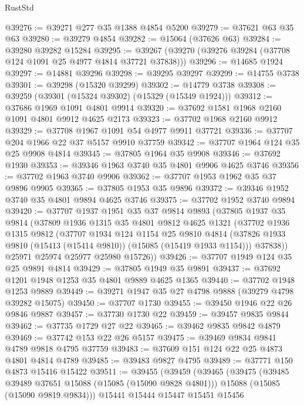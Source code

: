 \begin{lexlean}{RustStd}
\begin{coremodule}
@39276 := @39271 @277 @35 @1388 @4854 @5200
@39279 := @37621 @63 @35 @63
@39280 := @39279 @4854
@39282 := @15064 (@37626 @63)
@39284 := @39280 @39282 @15284
@39295 := @39267 (@39270 (@39276 @39284 (@37708 @124 @1091 @25 @4977 @4814 @37721 @37838)))
@39296 := @14685 @1924
@39297 := @14881 @39296
@39298 := @39295 @39297
@39299 := @14755 @3738
@39301 := @39298 (@15320 @39299)
@39302 := @14779 @3738
@39308 := @39259 (@39301 (@15324 @39302) (@15329 (@15349 @1924)))
@39312 := @37686 @1969 @1091 @4801 @9914
@39320 := @37692 @1581 @1968 @2160 @1091 @4801 @9912 @4625 @2173
@39323 := @37702 @1968 @2160 @9912
@39329 := @37708 @1967 @1091 @54 @4977 @9911 @37721
@39336 := @37707 @204 @1966 @22 @37 @5157 @9910 @37759
@39342 := @37707 @1964 @124 @35 @25 @9908 @4814
@39345 := @37805 @1964 @35 @9908
@39346 := @37692 @1930
@39353 := @39346 @1963 @3740 @35 @4801 @9906 @4625 @3746
@39356 := @37702 @1963 @3740 @9906
@39362 := @37707 @1953 @1962 @35 @37 @9896 @9905
@39365 := @37805 @1953 @35 @9896
@39372 := @39346 @1952 @3740 @35 @4801 @9894 @4625 @3746
@39375 := @37702 @1952 @3740 @9894
@39420 := @37707
    @1937
    @1951
    @35
    @37
    @9814
    @9893
    (@37805
      @1937
      @35
      @9814
      (@37809
        @1936
        @1315
        @35
        @4801
        @9812
        @4625
        @1321
        (@37702
          @1936
          @1315
          @9812
          (@37707
            @1934
            @124
            @1154
            @25
            @9810
            @4814
            (@37826 @1933 @9810 (@15413 (@15414 @9810)) (@15085 (@15419 @1933 @1154)))
            @37838))
        @25971
        @25974
        @25977
        @25980
        @15726))
@39426 := @37707 @1949 @124 @35 @25 @9891 @4814
@39429 := @37805 @1949 @35 @9891
@39437 := @37692 @1201 @1948 @1253 @35 @4801 @9889 @4625 @1365
@39440 := @37702 @1948 @1253 @9889
@39449 := @39271 @1947 @35 @27 @4798 @9888 (@39279 @4798 @39282 @15075)
@39450 := @37707 @1730
@39455 := @39450 @1946 @22 @26 @9846 @9887
@39457 := @37730 @1730 @22
@39459 := @39457 @9835 @9844
@39462 := @37735 @1729 @27 @22
@39465 := @39462 @9835 @9842 @4879
@39469 := @37742 @153 @22 @26 @5157
@39475 := @39469 @9834 @9841 @4789 @9818 @4795 @37759
@39483 := @37609 @151 @124 @22 @25 @4873 @4801 @4814 @4789
@39485 := @39483 @9827 @4795
@39489 := @37771 @150 @4873 @15416 @15422
@39511 := @39455
    (@39459
      (@39465
        (@39475
          (@39485 @39489 @37651 @15088 (@15085 (@15090 @9828 @4801)))
          @15088
          (@15085 (@15090 @9819 @9834)))
        @15441
        @15444
        @15447
        @15451
        @15456

\end{coremodule}
\end{lexlean}
